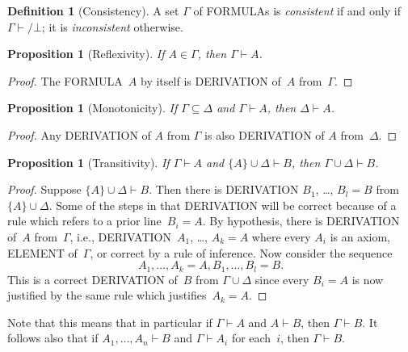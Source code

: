 \documentclass[10pt,a4paper]{article}
\newcommand*{\olup}[1]{\MakeUppercase{#1}}
\theoremstyle{plain}
\newtheorem{prop}[thm]{Proposition}
\theoremstyle{definition}
\newtheorem{defn}[thm]{Definition}
\theoremstyle{remark}
\newcommand*{\ollabel}[1]{\label{#1}}
\providecommand{\lfalse}{\bot}
\providecommand{\Proves}{\mathrel{\vdash}}
\begin{document}
\begin{defn}[Consistency]
A set $\Gamma$ of \olup{formula}s is \emph{consistent} if and only if
$\Gamma\Proves/ \lfalse$; it is \emph{inconsistent} otherwise.
\end{defn}

\begin{prop}[Reflexivity]
\ollabel{prop:reflexivity}
If $A \in \Gamma$, then $\Gamma \Proves A$.
\end{prop}

\begin{proof}
  The \olup{formula}~$A$ by itself is \olup{derivation} of~$A$ from~$\Gamma$.
\end{proof}

\begin{prop}[Monotonicity]
\ollabel{prop:monotonicity}
If $\Gamma \subseteq \Delta$ and $\Gamma \Proves A$, then $\Delta
\Proves A$.
\end{prop}

\begin{proof}
Any \olup{derivation} of $A$ from $\Gamma$ is also \olup{derivation} of
$A$ from~$\Delta$.
\end{proof}

\begin{prop}[Transitivity]
\ollabel{prop:transitivity}
If $\Gamma \Proves A$ and $\{A\} \cup \Delta \Proves
B$, then $\Gamma \cup \Delta \Proves B$.
\end{prop}

\begin{proof}
  Suppose $\{A\} \cup \Delta \Proves B$. Then there is
  \olup{derivation} $B_1$, \dots, $B_l = B$ from~$\{A\} \cup
  \Delta$. Some of the steps in that \olup{derivation} will be correct
  because of a rule which refers to a prior line~$B_i = A$. By
  hypothesis, there is \olup{derivation} of~$A$ from~$\Gamma$, i.e.,
  \olup{derivation}~$A_1$, \dots, $A_k = A$ where every $A_i$ is an
  axiom, \olup{element} of~$\Gamma$, or correct by a rule of
  inference. Now consider the sequence
  \[
  A_1, \dots, A_k = A, B_1, \dots, B_l = B.
  \]
  This is a correct \olup{derivation} of~$B$ from $\Gamma \cup \Delta$
  since every $B_i = A$ is now justified by the same rule which
  justifies~$A_k = A$.
\end{proof}

Note that this means that in particular if $\Gamma \Proves A$ and $A
\Proves B$, then $\Gamma \Proves B$. It follows also that if $A_1,
\dots, A_n \Proves B$ and $\Gamma \Proves A_i$ for each~$i$, then
$\Gamma \Proves B$.
\end{document}
